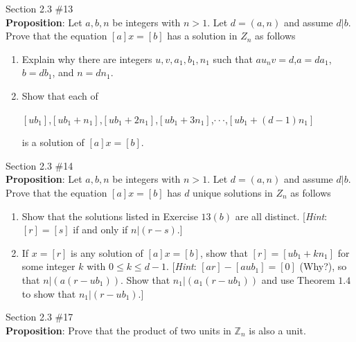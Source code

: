 \documentclass[12pt]{article}
\newcommand{\Z}{\mathbb{Z}}
\newenvironment{problem}[2][Problem]{\begin{trivlist}
\item[\hskip \labelsep {\bfseries #1}\hskip \labelsep {\bfseries #2.}]}{\end{trivlist}}
\begin{document}
\begin{problem}{5} Section 2.3 \#13 \\

\noindent
\textbf{Proposition}: Let $a,b,n$ be integers with $n>1$. Let $d=(a,n)$ and assume $d|b$. Prove that the equation $[a]x=[b]$ has a solution in $Z_n$ as follows 
\begin{enumerate}[label=(\alph*)]
\item Explain why there are integers $u,v,a_1,b_1,n_1$ such that $au_nv=d$,$a=da_1$, $b=db_1$, and $n=dn_1$.
\item Show that each of 
\begin{center}
$[ub_1]$,$[ub_1+n_1]$,$[ub_1+2n_1]$,$[ub_1+3n_1]$,$\cdot \cdot \cdot$,$[ub_1+(d-1)n_1]$
\end{center}
is a solution of $[a]x=[b]$. \\
\end{enumerate}
\end{problem}

\begin{problem}{6} Section 2.3 \#14 \\

\noindent
\textbf{Proposition}: Let $a,b,n$ be integers with $n>1$. Let $d=(a,n)$ and assume $d|b$. Prove that the equation $[a]x=[b]$ has $d$ unique solutions in $Z_n$ as follows 
\begin{enumerate}[label=(\alph*)]
\item Show that the solutions listed in Exercise $13(b)$ are all distinct. [\textit{Hint}: $[r] = [s]$ if and only if $n|(r-s)$.]
\item If $x=[r]$ is any solution of $[a]x=[b]$, show that $[r]=[ub_1+kn_1]$ for some integer $k$ with $0 \leq k \leq d - 1$. [\textit{Hint}: $[ar]-[aub_1]=[0]$ (Why?), so that $n|(a(r-ub_1))$. Show that $n_1|(a_1(r-ub_1))$ and use Theorem $1.4$ to show that $n_1|(r-ub_1)$.]
\end{enumerate}
\end{problem}

\begin{problem}{7} Section 2.3 \#17 \\

\noindent
\textbf{Proposition}: Prove that the product of two units in $\Z_n$ is also a unit.
\end{problem}
\end{document}

